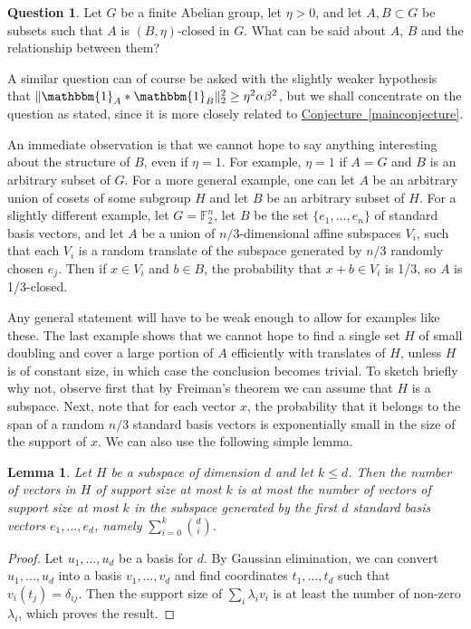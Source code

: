 \documentclass[11pt]{article}
\numberwithin{equation}{section}
\newtheorem{lemma}[theorem]{Lemma}
\theoremstyle{definition}
\newtheorem{question}[theorem]{Question}
\theoremstyle{plain}
\newcommand{\expref}[2]{\hyperref[#2]{#1~\ref{#2}}}
\newcommand\F{\mathbb{F}}
\renewcommand\a{\alpha}
\newcommand\be{\beta}
\renewcommand\d{\delta}
\newcommand{\ind}{\mathbbm{1}}
\renewcommand\AA{\ind_A}
\newcommand\BB{\ind_B}
\begin{document}
\begin{question} \label{generalq}
	Let $G$ be a finite Abelian group, let $\eta>0$, and let $A,B\subset G$ be subsets such that $A$ is $(B,\eta)$-closed in $G$. What can be said about $A$, $B$ and the relationship between them?
\end{question}

\noindent A similar question can of course be asked with the slightly weaker hypothesis that $\|\AA*\BB\|_2^2\geq\eta^2\a \be^2$, but we shall concentrate on the question as stated, since it is more closely related to \expref{Conjecture}{mainconjecture}.

An immediate observation is that we cannot hope to say anything interesting about the structure of $B$, even if $\eta=1$. For example, $\eta=1$ if $A=G$ and $B$ is an arbitrary subset of $G$. For a more general example, one can let $A$ be an arbitrary union of cosets of some subgroup $H$ and let $B$ be an arbitrary subset of $H$. For a slightly different example, let $G=\F_2^n$, let $B$ be the set $\{e_1,\dots,e_n\}$ of standard basis vectors, and let $A$ be a union of $n/3$-dimensional affine subspaces $V_i$, such that each $V_i$ is a random translate of the subspace generated by $n/3$ randomly chosen $e_j$. Then if $x\in V_i$ and $b\in B$, the probability that $x+b\in V_i$ is 1/3, so $A$ is 1/3-closed.

Any general statement will have to be weak enough to allow for examples like these. The last example shows that we cannot hope to find a single set $H$ of small doubling and cover a large portion of $A$ efficiently with translates of $H$, unless $H$ is of constant size, in which case the conclusion becomes trivial. To sketch briefly why not, observe first that by Freiman's theorem we can assume that $H$ is a subspace. Next, note that for each vector $x$, the probability that it belongs to the span of a random $n/3$ standard basis vectors is exponentially small in the size of the support of $x$. We can also use the following simple lemma.

\begin{lemma}
	Let $H$ be a subspace of dimension $d$ and let $k\leq d$. Then the number of vectors in $H$ of support size at most $k$ is at most the number of vectors of support size at most $k$ in the subspace generated by the first $d$ standard basis vectors $e_1,\dots,e_d$, namely $\sum_{i=0}^k\binom di$.
\end{lemma}

\begin{proof}
	Let $u_1,\dots,u_d$ be a basis for $d$. By Gaussian elimination, we can convert $u_1,\dots,u_d$ into a basis $v_1,\dots,v_d$ and find coordinates $t_1,\dots,t_d$ such that $v_i(t_j)=\d_{ij}$. Then the support size of $\sum_i\lambda_iv_i$ is at least the number of non-zero $\lambda_i$, which proves the result.
\end{proof}
\end{document}
